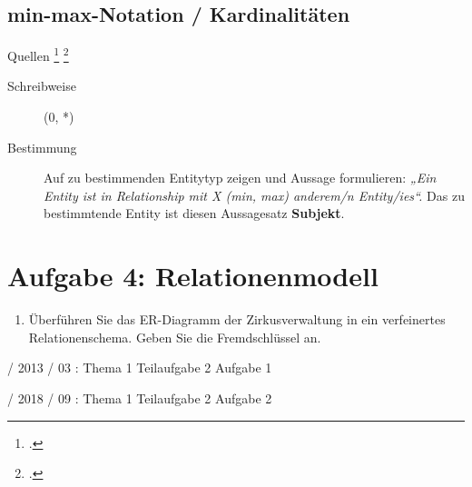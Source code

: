 \documentclass{lehramt-informatik-haupt}
\begin{document}
\subsection{min-max-Notation / Kardinalitäten}

Quellen
\footcite[2.7.3 Seite 46]{kemper}
\footcite[Seite 62]{brinda}

\begin{description}
\item[Schreibweise] (0, *)
\item[Bestimmung]

Auf zu bestimmenden Entitytyp zeigen und Aussage formulieren:
%
\emph{„Ein Entity ist in Relationship mit X (min, max) anderem/n
Entity/ies“.}
%
Das zu bestimmtende Entity ist diesen Aussagesatz \textbf{Subjekt}.
\end{description}



\section{Aufgabe 4: Relationenmodell}

\begin{enumerate}


\item Überführen Sie das ER-Diagramm der Zirkusverwaltung in
ein verfeinertes Relationenschema. Geben Sie die Fremdschlüssel an.

\end{enumerate}

%

 / 2013 / 03 : Thema 1 Teilaufgabe 2 Aufgabe 1

 / 2018 / 09 : Thema 1 Teilaufgabe 2 Aufgabe 2



\literatur
\end{document}
